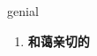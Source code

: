 
\begin{frame}
{\huge genial}
\begin{center}
\begin{enumerate}\Large
  \item \textbf{和蔼亲切的}
\end{enumerate}
\end{center}
\end{frame}
